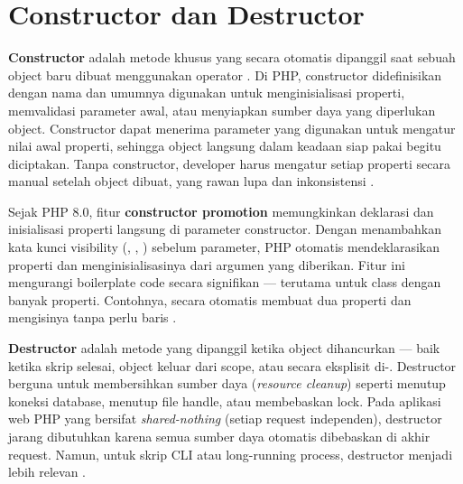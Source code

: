 ﻿\section{Constructor dan Destructor}

\textbf{Constructor} adalah metode khusus yang secara otomatis dipanggil saat sebuah object baru dibuat menggunakan operator . Di PHP, constructor didefinisikan dengan nama  dan umumnya digunakan untuk menginisialisasi properti, memvalidasi parameter awal, atau menyiapkan sumber daya yang diperlukan object. Constructor dapat menerima parameter yang digunakan untuk mengatur nilai awal properti, sehingga object langsung dalam keadaan siap pakai begitu diciptakan. Tanpa constructor, developer harus mengatur setiap properti secara manual setelah object dibuat, yang rawan lupa dan inkonsistensi \cite{phpManual}.

Sejak PHP 8.0, fitur \textbf{constructor promotion} memungkinkan deklarasi dan inisialisasi properti langsung di parameter constructor. Dengan menambahkan kata kunci visibility (, , ) sebelum parameter, PHP otomatis mendeklarasikan properti dan menginisialisasinya dari argumen yang diberikan. Fitur ini mengurangi boilerplate code secara signifikan --- terutama untuk class dengan banyak properti. Contohnya,  secara otomatis membuat dua properti dan mengisinya tanpa perlu baris  \cite{phpRightWay}.

\textbf{Destructor} adalah metode  yang dipanggil ketika object dihancurkan --- baik ketika skrip selesai, object keluar dari scope, atau secara eksplisit di-. Destructor berguna untuk membersihkan sumber daya (\textit{resource cleanup}) seperti menutup koneksi database, menutup file handle, atau membebaskan lock. Pada aplikasi web PHP yang bersifat \textit{shared-nothing} (setiap request independen), destructor jarang dibutuhkan karena semua sumber daya otomatis dibebaskan di akhir request. Namun, untuk skrip CLI atau long-running process, destructor menjadi lebih relevan \cite{phpManual}.

